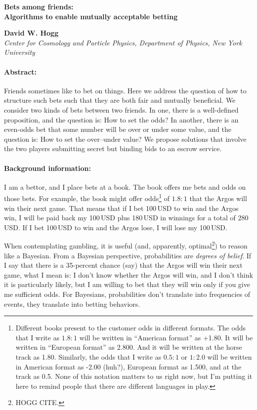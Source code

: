 \documentclass{article}
\begin{document}
\noindent
\textbf{Bets among friends:\\ Algorithms to enable mutually acceptable betting}

\medskip
\noindent
\textbf{David W. Hogg}\\
\textit{Center for Cosmology and Particle Physics, Department of Physics, New York University}

\paragraph{Abstract:}
Friends sometimes like to bet on things.
Here we address the question of how to structure such bets such that they are both fair and mutually beneficial.
We consider two kinds of bets between two friends.
In one, there is a well-defined proposition, and the question is:
How to set the odds?
In another, there is an even-odds bet that some number will be over or under some value, and the question is:
How to set the over--under value?
We propose solutions that involve the two players submitting secret but binding bids to an escrow service.

\paragraph{Background information:}
I am a bettor, and I place bets at a book.
The book offers me bets and odds on those bets.
For example, the book might offer odds\footnote{%
Different books present to the customer odds in different formats.
The odds that I write as $1.8:1$ will be written in ``American format'' as +1.80.
It will be written in ``European format'' as 2.800.
And it will be written at the horse track as 1.80.
Similarly, the odds that I write as $0.5:1$ or $1:2.0$ will be written in American format as -2.00 (huh?),
European format as 1.500,
and at the track as 0.5.
None of this notation matters to us right now, but I'm putting it here to remind people that there are
different languages in play.}
of $1.8:1$ that the Argos will win their next game.
That means that if I bet 100\,USD to win and the Argos win, I will be paid back my 100\,USD plus 180\,USD in winnings for a total of 280\,USD.
If I bet 100\,USD to win and the Argos lose, I will lose my 100\,USD.

When contemplating gambling, it is useful (and, apparently, optimal\footnote{HOGG CITE.}) to reason like a Bayesian.
From a Bayesian perspective, probabilities are \emph{degrees of belief}.
If I say that there is a 35-percent chance (say) that the Argos will win their next game, what I mean is:
I don't know whether the Argos will win, and I don't think it is particularly likely,
but I am willing to bet that they will win only if you give me sufficient odds.
For Bayesians, probabilities don't translate into frequencies of events, they translate into betting
behaviors.
\end{document}
